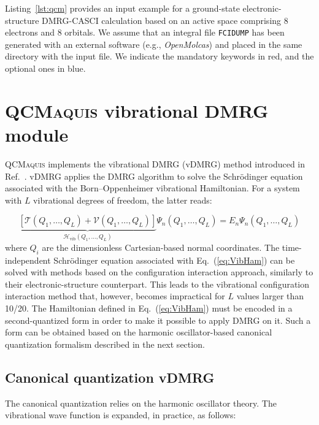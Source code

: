\documentclass[bibliography=totoc,12pt,a4paper]{scrartcl}
\newcommand{\qcm}{\textsc{QCMaquis}}
\begin{document}
Listing~\ref{lst:qcm} provides an input example for a ground-state electronic-structure DMRG-CASCI calculation based on an active space comprising 8 electrons and 8 orbitals.
We assume that an integral file \texttt{FCIDUMP} has been generated with an external software (e.g., \textsl{OpenMolcas}) and placed in the same directory with the input file.
We indicate the mandatory keywords in red, and the optional ones in blue.

\section{\qcm{} vibrational DMRG module}
\label{sec:vDMRG}

\qcm{} implements the vibrational DMRG (vDMRG) method introduced in Ref.~.
vDMRG applies the DMRG algorithm to solve the Schr\"odinger equation associated with the Born--Oppenheimer vibrational Hamiltonian.
For a system with $L$ vibrational degrees of freedom, the latter reads:

\begin{equation}
  \underbrace{\left[ \mathcal{T}(Q_1, \ldots, Q_L) + \mathcal{V}(Q_1, \ldots, Q_L) \right]}_{\mathcal{H}_\text{vib}(Q_1, \ldots, Q_L)} \Psi_n(Q_1, \ldots, Q_L) = E_n \Psi_n(Q_1, \ldots, Q_L)
  \label{eq:VibHam}
\end{equation}
%
where $Q_i$ are the dimensionless Cartesian-based normal coordinates.
The time-independent Schr\"odinger equation associated with Eq.~(\ref{eq:VibHam}) can be solved with methods based on the configuration interaction approach, similarly to their electronic-structure counterpart.
This leads to the vibrational configuration interaction method that, however, becomes impractical for $L$ values larger than 10/20.
The Hamiltonian defined in Eq.~(\ref{eq:VibHam}) must be encoded in a second-quantized form in order to make it possible to apply DMRG on it.
Such a form can be obtained based on the harmonic oscillator-based canonical quantization formalism\cite{Hirata2014_NormalOrdered} described in the next section.

\subsection{Canonical quantization vDMRG}
\label{sec:canonical}

The canonical quantization relies on the harmonic oscillator theory.\cite{Hirata2014_NormalOrdered}
The vibrational wave function is expanded, in practice, as follows:
\end{document}
